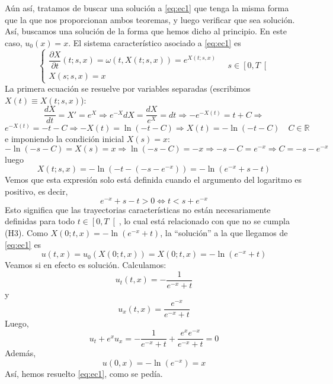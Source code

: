\documentclass[12pt]{article}
\newcommand{\R}{\mathbb{R}}
\begin{document}
\begin{ejercicio}
        Aún así, tratamos de buscar una solución a \eqref{eq:ec1} que tenga la misma forma que la que nos proporcionan ambos teoremas, y luego verificar que sea solución. Así, buscamos una solución de la forma que hemos dicho al principio.
        En este caso, $u_0(x) = x$. El sistema característico asociado a \eqref{eq:ec1} es 
        \begin{equation*}
            \begin{cases}
                \dfrac{\partial X}{\partial t}(t;s,x)
                =\omega(t,X(t;s,x)) = e^{X(t;s,x)}\\[6pt]
                X(s;s,x)=x
            \end{cases}\quad s \in \left[0, T \right[
        \end{equation*}
        La primera ecuación se resuelve por variables separadas (escribimos $X(t) \equiv X(t;s,x)$):
        $$\dfrac{dX}{dt} = X' = e^X \Longrightarrow e^{-X}dX = \dfrac{dX}{e^X} = dt \Longrightarrow -e^{-X(t)} = t + C \Longrightarrow$$
        $$e^{-X(t)} = -t - C \Longrightarrow -X(t) = \ln(-t-C) \Longrightarrow X(t) = -\ln(-t-C) \quad C \in \R$$
        e imponiendo la condición inicial $X(s) = x$:
        $$-\ln(-s-C) = X(s) = x \Longrightarrow \ln(-s-C) = -x \Longrightarrow -s - C = e^{-x} \Longrightarrow C = - s - e^{-x}$$
        luego
        $$X(t;s,x) = -\ln(-t-(- s - e^{-x})) = - \ln(e^{-x} + s - t)$$
        Vemos que esta expresión solo está definida cuando el argumento del logaritmo es positivo, es decir,
        $$e^{-x}+s-t>0 \iff t<s+e^{-x}$$
        Esto significa que las trayectorias características no están necesariamente definidas para todo $t\in \left[0,T\right[$, lo cual está relacionado con que no se cumpla (H3).
        Como $X(0;t,x) = - \ln(e^{-x} + t)$, la ``solución'' a la que llegamos de \eqref{eq:ec1} es
        $$\boxed{u(t,x) = u_0(X(0;t,x)) = X(0;t,x) = - \ln(e^{-x} + t)}$$
        Veamos si en efecto es solución. Calculamos:
        $$u_t(t,x)=-\frac{1}{e^{-x}+t}$$
        y
        $$u_x(t,x)=\frac{e^{-x}}{e^{-x}+t}$$
        Luego,
        $$u_t+e^xu_x =-\frac{1}{e^{-x}+t} + \frac{e^xe^{-x}}{e^{-x}+t} =0$$
        Además,
        $$u(0,x)=-\ln(e^{-x})=x$$
        Así, hemos resuelto \eqref{eq:ec1}, como se pedía.
    \end{ejercicio}
\end{document}
